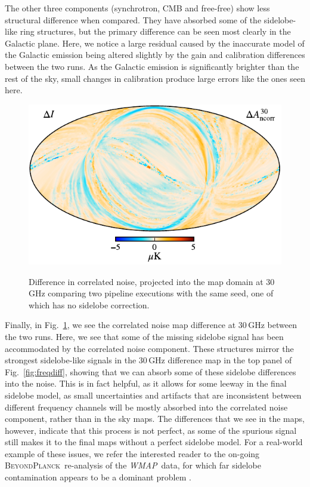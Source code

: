 \documentclass[twocolumn]{aa}
\def\WMAP{\textit{WMAP}}
\newcommand{\BP}{\textsc{BeyondPlanck}}
\begin{document}
The other three components (synchrotron, CMB and free-free) show less structural difference when compared. They have absorbed some of the sidelobe-like ring structures, but the primary difference can be seen most clearly in the Galactic plane. Here, we notice a large residual caused by the inaccurate model of the Galactic emission being altered slightly by the gain and calibration differences between the two runs. As the Galactic emission is significantly brighter than the rest of the sky, small changes in calibration produce large errors like the ones seen here.

\begin{figure}[t]
  \center
  \includegraphics[width=0.95\linewidth]{figs/ncorr_diff.pdf}\\
  \caption{Difference in correlated noise, projected into the map domain at 30 GHz comparing two pipeline executions with the same seed, one of which has no sidelobe correction.
  }\label{fig:ncorr}
\end{figure}

Finally, in Fig.~\ref{fig:ncorr}, we see the correlated noise map difference at 30\,GHz between the two runs. Here, we see that some of the missing sidelobe signal has been accommodated by the correlated noise component. These structures mirror the strongest sidelobe-like signals in the 30\,GHz difference map in the top panel of Fig.~\ref{fig:freqdiff}, showing that we can absorb some of these sidelobe differences into the noise. This is in fact helpful, as it allows for some leeway in the final sidelobe model, as small uncertainties and artifacts that are inconsistent between different frequency channels will be mostly absorbed into the correlated noise component, rather than in the sky maps. The differences that we see in the maps, however, indicate that this process is not perfect, as some of the spurious signal still makes it to the final maps without a perfect sidelobe model. For a real-world example of these issues, we refer the interested reader to the on-going \BP\ re-analysis of the \WMAP\ data, for which far sidelobe contamination appears to be a dominant problem \citep{bp17}.
\end{document}
